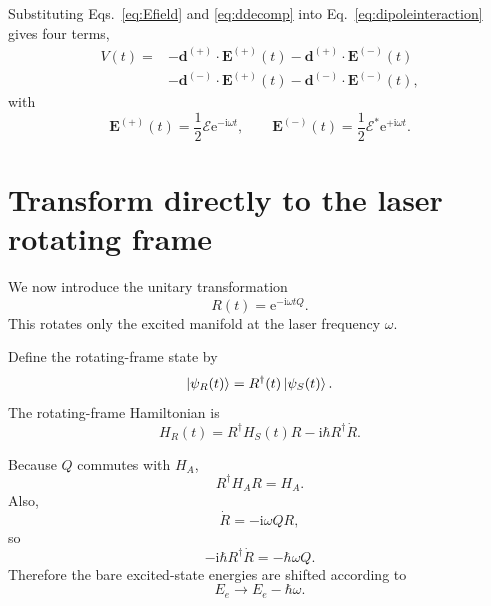 \documentclass[11pt]{article}
\newcommand{\ee}{\mathrm{e}}
\newcommand{\ii}{\mathrm{i}}
\newcommand{\Hatom}{H_A}
\newcommand{\HR}{H_R}
\newcommand{\projE}{Q}
\begin{document}
Substituting Eqs.~\eqref{eq:Efield} and \eqref{eq:ddecomp} into Eq.~\eqref{eq:dipoleinteraction} gives four terms,
\begin{align}
V(t)
={}&-
\bm d^{(+)}\cdot \bm E^{(+)}(t)
-
\bm d^{(+)}\cdot \bm E^{(-)}(t)
\nonumber\\
&-
\bm d^{(-)}\cdot \bm E^{(+)}(t)
-
\bm d^{(-)}\cdot \bm E^{(-)}(t),
\label{eq:fourterms}
\end{align}
with
\begin{equation}
\bm E^{(+)}(t)=\frac{1}{2}\bm{\mathcal E}\ee^{-\ii\omega t},
\qquad
\bm E^{(-)}(t)=\frac{1}{2}\bm{\mathcal E}^{*}\ee^{+\ii\omega t}.
\label{eq:Epm}
\end{equation}

\section{Transform directly to the laser rotating frame}

We now introduce the unitary transformation
\begin{equation}
R(t)=\ee^{-\ii\omega t\projE}.
\label{eq:Rdef}
\end{equation}
This rotates only the excited manifold at the laser frequency $\omega$.

Define the rotating-frame state by
\begin{equation}
\ket{\psi_R(t)}=R^\dagger(t)\ket{\psi_S(t)}.
\label{eq:psir}
\end{equation}
The rotating-frame Hamiltonian is
\begin{equation}
\HR(t)
=
R^\dagger H_S(t)R
-
\ii\hbar R^\dagger \dot R.
\label{eq:HRgeneral}
\end{equation}

Because $\projE$ commutes with $\Hatom$,
\begin{equation}
R^\dagger \Hatom R=\Hatom.
\label{eq:HArot}
\end{equation}
Also,
\begin{equation}
\dot R=-\ii\omega\projE R,
\label{eq:Rdot}
\end{equation}
so
\begin{equation}
-\ii\hbar R^\dagger\dot R
=-\hbar\omega\projE.
\label{eq:frameenergy}
\end{equation}
Therefore the bare excited-state energies are shifted according to
\begin{equation}
E_e\longrightarrow E_e-\hbar\omega.
\label{eq:eshift}
\end{equation}
\end{document}

